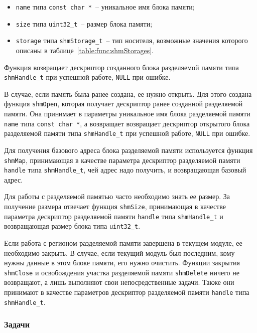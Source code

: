 \begin{itemize}
    \item \lstinline{name} типа \lstinline{const char *}~-- уникальное имя блока памяти;
    \item \lstinline{size} типа \lstinline{uint32_t}~-- размер блока памяти;
    \item \lstinline{storage} типа \lstinline{shmStorage_t}~-- тип носителя,
    возможные значения которого описаны в таблице~\ref{table:func:shmStorages}.
\end{itemize}

Функция возвращает дескриптор созданного блока разделяемой памяти типа \lstinline{shmHandle_t} при успешной работе, \lstinline{NULL} при ошибке.

В случае, если память была ранее создана, ее нужно открыть. Для этого создана функция \lstinline{shmOpen}, которая получает дескриптор ранее созданной разделяемой памяти. Она принимает в параметры
уникальное имя блока разделяемой памяти \lstinline{name} типа \lstinline{const char *}, а возвращает возвращает дескриптор открытого блока разделяемой памяти типа \lstinline{shmHandle_t} при успешной работе, \lstinline{NULL} при ошибке.

Для получения базового адреса блока разделяемой памяти используется функция \lstinline{shmMap}, принимающая в качестве параметра дескриптор разделяемой памяти \lstinline{handle} типа \lstinline{shmHandle_t}, чей адрес надо получить, и возвращающая базовый адрес.

Для работы с разделяемой памятью часто необходимо знать ее размер. За получение размера отвечает функция \lstinline{shmSize}, принимающая в качестве параметра дескриптор разделяемой памяти \lstinline{handle} типа \lstinline{shmHandle_t} и возвращающая размер блока типа \lstinline{uint32_t}.

Если работа с регионом разделяемой памяти завершена в текущем модуле, ее необходимо
закрыть. В случае, если текущий модуль был последним, кому нужны данные в этом блоке
памяти, его нужно очистить. Функции закрытия \lstinline{shmClose} и освобождения участка разделяемой памяти \lstinline{shmDelete} ничего не возвращают, а лишь
выполняют свои непосредственные задачи. Также они принимают в качестве параметров дескриптор разделяемой памяти \lstinline{handle} типа \lstinline{shmHandle_t}.

\subsubsection{Задачи}

